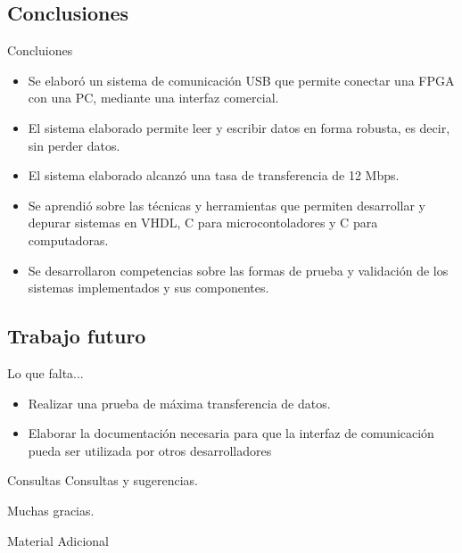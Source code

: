 \documentclass[11pt,a4paper]{beamer}
\begin{document}
		\subsection{Conclusiones}
			\begin{frame}{Concluiones}
				\begin{itemize}
					\item Se elaboró un sistema de comunicación USB que permite conectar una FPGA con una PC, mediante una interfaz comercial.
					\item El sistema elaborado permite leer y escribir datos en forma robusta, es decir, sin perder datos.
					\item El sistema elaborado alcanzó una tasa de transferencia de 12 Mbps.
					\item Se aprendió sobre las técnicas y herramientas que permiten desarrollar y depurar sistemas en VHDL, C para microcontoladores y C para computadoras.
					\item Se desarrollaron competencias sobre las formas de prueba y validación de los sistemas implementados y sus componentes.
				\end{itemize}
			\end{frame}
		\subsection{Trabajo futuro}
			\begin{frame}{Lo que falta...}
				\begin{itemize}
					\item Realizar una prueba de máxima transferencia de datos.
					\item Elaborar la documentación necesaria para que la interfaz de comunicación pueda ser utilizada por otros desarrolladores
				\end{itemize}
			\end{frame}
			\begin{frame}{Consultas}
				Consultas y sugerencias.
			\end{frame}
			\begin{frame}[c]
				\centering
				\alert {Muchas gracias.}
			\end{frame}
			
			\begin{frame}{Material Adicional}
			\end{frame}
			\scriptsize{
			}
\end{document}
